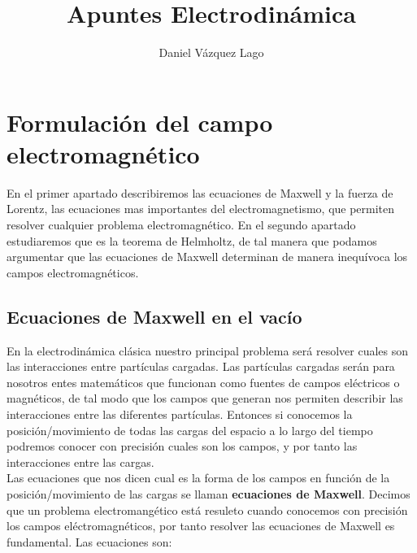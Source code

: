 \documentclass[12pt,a4paper]{article}
\author{Daniel Vázquez Lago}
\title{Apuntes Electrodinámica}
\numberwithin{equation}{section}
\numberwithin{figure}{section}
\begin{document}
\maketitle

\newpage

\tableofcontents

\newpage

\section{Formulación del campo electromagnético}

En el primer apartado describiremos las ecuaciones de Maxwell y la fuerza de Lorentz, las ecuaciones mas importantes del electromagnetismo, que permiten resolver cualquier problema electromagnético. En el segundo apartado estudiaremos que es la teorema de Helmholtz, de tal manera que podamos argumentar que las ecuaciones de Maxwell determinan de manera inequívoca los campos electromagnéticos. 

\subsection{Ecuaciones de Maxwell en el vacío}


En la electrodinámica clásica nuestro principal problema será resolver cuales son las interacciones entre partículas cargadas. Las partículas cargadas serán para nosotros entes matemáticos que funcionan como fuentes de campos eléctricos o magnéticos, de tal modo que los campos que generan nos permiten describir las interacciones entre las diferentes partículas.  Entonces si conocemos la posición/movimiento de todas las cargas del espacio a lo largo del tiempo podremos conocer con precisión cuales son los campos, y por tanto las interacciones entre las cargas. \\

Las ecuaciones que nos dicen cual es la forma de los campos en función de la posición/movimiento de las cargas se llaman \textbf{ecuaciones de Maxwell}. Decimos que un problema electromangético está resuleto cuando conocemos con precisión los campos eléctromagnéticos, por tanto resolver las ecuaciones de Maxwell es fundamental. Las ecuaciones son:
\end{document}
